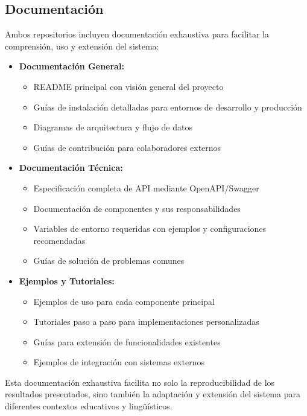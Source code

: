 \subsection{Documentación}
\label{subsec:documentacion-repositorios}

Ambos repositorios incluyen documentación exhaustiva para facilitar la comprensión, uso y extensión del sistema:

\begin{itemize}
    \item \textbf{Documentación General:}
    \begin{itemize}
        \item README principal con visión general del proyecto
        \item Guías de instalación detalladas para entornos de desarrollo y producción
        \item Diagramas de arquitectura y flujo de datos
        \item Guías de contribución para colaboradores externos
    \end{itemize}
    
    \item \textbf{Documentación Técnica:}
    \begin{itemize}
        \item Especificación completa de API mediante OpenAPI/Swagger
        \item Documentación de componentes y sus responsabilidades
        \item Variables de entorno requeridas con ejemplos y configuraciones recomendadas
        \item Guías de solución de problemas comunes
    \end{itemize}
    
    \item \textbf{Ejemplos y Tutoriales:}
    \begin{itemize}
        \item Ejemplos de uso para cada componente principal
        \item Tutoriales paso a paso para implementaciones personalizadas
        \item Guías para extensión de funcionalidades existentes
        \item Ejemplos de integración con sistemas externos
    \end{itemize}
\end{itemize}

Esta documentación exhaustiva facilita no solo la reproducibilidad de los resultados presentados, sino también la adaptación y extensión del sistema para diferentes contextos educativos y lingüísticos.

